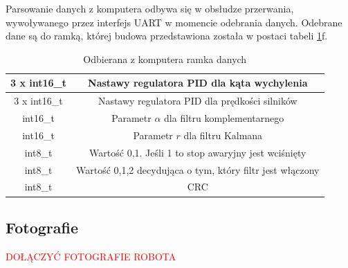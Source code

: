 Parsowanie danych z komputera odbywa się w obsłudze przerwania, wywoływanego przez interfejs UART w momencie odebrania danych. Odebrane dane są do ramką, której budowa przedstawiona została w postaci tabeli \ref{Ramka odebrana}f.

\begin{table}[h!]
    \centering
    \caption{Odbierana z komputera ramka danych}
    \begin{tabular}{|c|c|}
        \hline
        3 x int16\_t & Nastawy regulatora PID dla kąta wychylenia \\
        \hline
        3 x int16\_t & Nastawy regulatora PID dla prędkości silników \\
        \hline
        int16\_t & Parametr $\alpha$ dla filtru komplementarnego \\
        \hline
        int16\_t & Parametr $r$ dla filtru Kalmana \\
        \hline
        int8\_t & Wartość 0,1. Jeśli 1 to stop awaryjny jest wciśnięty \\
        \hline
        int8\_t & Wartość 0,1,2 decydująca o tym, który filtr jest włączony \\
        \hline
        int8\_t & CRC \\
        \hline
    \end{tabular}
    \label{Ramka odebrana}
\end{table}

\subsection{Fotografie}

\textcolor{red}{DOŁĄCZYĆ FOTOGRAFIE ROBOTA}
